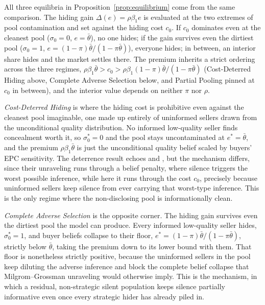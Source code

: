 All three equilibria in Proposition~\ref{prop:equilibrium} come from the same comparison. The hiding gain $\Delta(e)=\rho\beta_1 e$ is evaluated at the two extremes of pool contamination and set against the hiding cost $c_0$. If $c_0$ dominates even at the cleanest pool ($\sigma_0=0$, $e=\bar{\theta}$), no one hides; if the gain survives even the dirtiest pool ($\sigma_0=1$, $e=(1-\pi)\bar{\theta}/(1-\pi\bar{\theta})$), everyone hides; in between, an interior share hides and the market settles there. The premium inherits a strict ordering across the three regimes, $\rho\beta_1\bar{\theta} > c_0 > \rho\beta_1(1-\pi)\bar{\theta}/(1-\pi\bar{\theta})$ (Cost-Deterred Hiding above, Complete Adverse Selection below, and Partial Pooling pinned at $c_0$ in between), and the interior value depends on neither $\pi$ nor $\rho$.

\emph{Cost-Deterred Hiding} is where the hiding cost is prohibitive even against the cleanest pool imaginable, one made up entirely of uninformed sellers drawn from the unconditional quality distribution. No informed low-quality seller finds concealment worth it, so $\sigma_0^*=0$ and the pool stays uncontaminated at $e^*=\bar{\theta}$, and the premium $\rho\beta_1\bar{\theta}$ is just the unconditional quality belief scaled by buyers' EPC sensitivity. The deterrence result echoes \citet{milgrom_good_1981} and \citet{grossman_informational_1981}, but the mechanism differs, since their unraveling runs through a belief penalty, where silence triggers the worst possible inference, while here it runs through the cost $c_0$, precisely because uninformed sellers keep silence from ever carrying that worst-type inference. This is the only regime where the non-disclosing pool is informationally clean.

\emph{Complete Adverse Selection} is the opposite corner. The hiding gain survives even the dirtiest pool the model can produce. Every informed low-quality seller hides, $\sigma_0^*=1$, and buyer beliefs collapse to their floor, $e^*=(1-\pi)\bar{\theta}/(1-\pi\bar{\theta})$, strictly below $\bar{\theta}$, taking the premium down to its lower bound with them. That floor is nonetheless strictly positive, because the uninformed sellers in the pool keep diluting the adverse inference and block the complete belief collapse that Milgrom--Grossman unraveling would otherwise imply. This is the \citet{dye_disclosure_1985} mechanism, in which a residual, non-strategic silent population keeps silence partially informative even once every strategic hider has already piled in.

